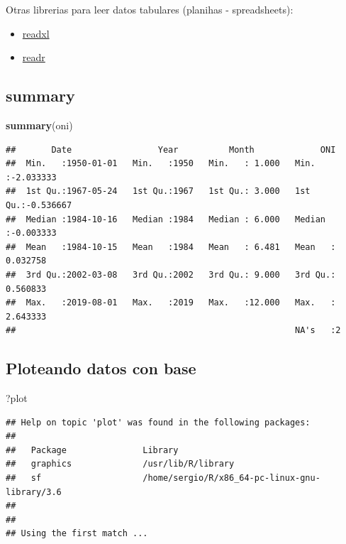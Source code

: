 \documentclass[]{book}
\newenvironment{Shaded}{\begin{snugshade}}{\end{snugshade}}
\newcommand{\KeywordTok}[1]{\textcolor[rgb]{0.13,0.29,0.53}{\textbf{#1}}}
\newcommand{\NormalTok}[1]{#1}
\providecommand{\tightlist}{%
  \setlength{\itemsep}{0pt}\setlength{\parskip}{0pt}}
\begin{document}
Otras librerias para leer datos tabulares (planihas - spreadsheets):

\begin{itemize}
\tightlist
\item
  \href{https://readxl.tidyverse.org/}{readxl}
\item
  \href{https://readr.tidyverse.org/}{readr}
\end{itemize}

\hypertarget{summary}{%
\subsection{summary}\label{summary}}

\begin{Shaded}
\begin{Highlighting}[]
\KeywordTok{summary}\NormalTok{(oni)}
\end{Highlighting}
\end{Shaded}

\begin{verbatim}
##       Date                 Year          Month             ONI           
##  Min.   :1950-01-01   Min.   :1950   Min.   : 1.000   Min.   :-2.033333  
##  1st Qu.:1967-05-24   1st Qu.:1967   1st Qu.: 3.000   1st Qu.:-0.536667  
##  Median :1984-10-16   Median :1984   Median : 6.000   Median :-0.003333  
##  Mean   :1984-10-15   Mean   :1984   Mean   : 6.481   Mean   : 0.032758  
##  3rd Qu.:2002-03-08   3rd Qu.:2002   3rd Qu.: 9.000   3rd Qu.: 0.560833  
##  Max.   :2019-08-01   Max.   :2019   Max.   :12.000   Max.   : 2.643333  
##                                                       NA's   :2
\end{verbatim}

\hypertarget{ploteando-datos-con-base}{%
\subsection{Ploteando datos con base}\label{ploteando-datos-con-base}}

\begin{Shaded}
\begin{Highlighting}[]
\NormalTok{?plot}
\end{Highlighting}
\end{Shaded}

\begin{verbatim}
## Help on topic 'plot' was found in the following packages:
## 
##   Package               Library
##   graphics              /usr/lib/R/library
##   sf                    /home/sergio/R/x86_64-pc-linux-gnu-library/3.6
## 
## 
## Using the first match ...
\end{verbatim}
\end{document}
